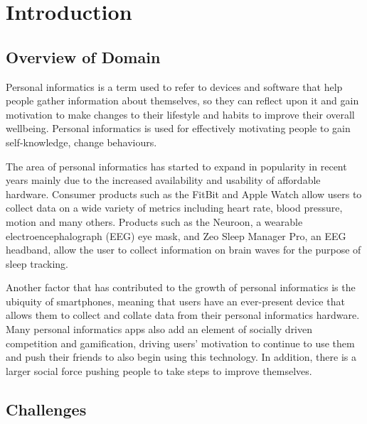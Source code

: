 \section{Introduction}

\subsection{Overview of Domain}


Personal informatics is a term used to refer to devices and software that help people gather
information about themselves, so they can reflect upon it and gain motivation to make changes to
their lifestyle and habits to improve their overall wellbeing. Personal informatics is used for
effectively motivating people to gain self-knowledge, change behaviours. %

The area of personal informatics has started to expand in popularity in recent years mainly due to
the increased availability and usability of affordable hardware. Consumer products such as the
FitBit and Apple Watch allow users to collect data on a wide variety of metrics including heart
rate, blood pressure, motion and many others. Products such as the Neuroon, a wearable
electroencephalograph (EEG) eye mask, and Zeo Sleep Manager Pro, an EEG headband, allow the user to
collect information on brain waves for the purpose of sleep tracking.


Another factor that has contributed to the growth of personal informatics is the ubiquity of
smartphones, meaning that users have an ever-present device that allows them to collect and collate
data from their personal informatics hardware. Many personal informatics apps also add an element of
socially driven competition and gamification, driving users' motivation to continue to use them and
push their friends to also begin using this technology. In addition, there is a larger social force
pushing people to take steps to improve themselves. %


\subsection{Challenges}

